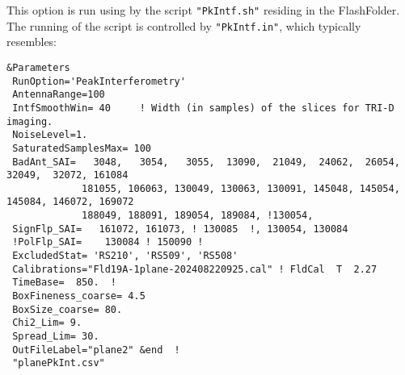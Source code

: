 This option is run using by the script \verb!"PkIntf.sh"! residing in the FlashFolder. The running of the script is controlled by \verb!"PkIntf.in"!, which typically resembles:

\begin{linenumbers}
\resetlinenumber
\tiny
\begin{verbatim}
&Parameters
 RunOption='PeakInterferometry'
 AntennaRange=100
 IntfSmoothWin= 40     ! Width (in samples) of the slices for TRI-D imaging.
 NoiseLevel=1.
 SaturatedSamplesMax= 100
 BadAnt_SAI=   3048,   3054,   3055,  13090,  21049,  24062,  26054,  32049,  32072, 161084
             181055, 106063, 130049, 130063, 130091, 145048, 145054, 145084, 146072, 169072
             188049, 188091, 189054, 189084, !130054,
 SignFlp_SAI=   161072, 161073, ! 130085  !, 130054, 130084
 !PolFlp_SAI=    130084 ! 150090 !
 ExcludedStat= 'RS210', 'RS509', 'RS508'
 Calibrations="Fld19A-1plane-202408220925.cal" ! FldCal  T  2.27
 TimeBase=  850.  !
 BoxFineness_coarse= 4.5
 BoxSize_coarse= 80.
 Chi2_Lim= 9.
 Spread_Lim= 30.
 OutFileLabel="plane2" &end  !
 "planePkInt.csv"
\end{verbatim}
\end{linenumbers}


